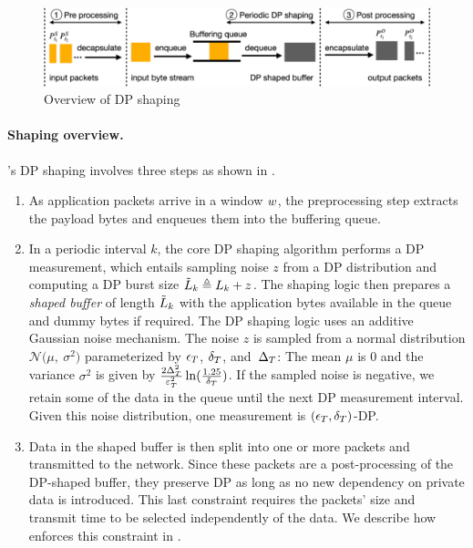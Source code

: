 \begin{figure}[t]
    \centering
    \includegraphics[width=\columnwidth]{figures/dp-overview.pdf}
    \caption{Overview of DP shaping}
    \label{fig:dp-overview}
\end{figure}

\paragraph{Shaping overview.}
\sys's DP shaping involves three steps as shown in .
\begin{enumerate}
    \item As application packets arrive in a window $w$, the preprocessing step extracts the payload bytes and enqueues them into the buffering queue.
    \item In a periodic interval $k$, the core DP shaping algorithm performs a DP measurement, which entails sampling noise $z$ from a DP distribution and computing a DP burst size $\tilde{L}_{k} \triangleq L_{k} + z$.
    The shaping logic then prepares a {\em shaped buffer} of length $\tilde{L}_{k}$ with the application bytes available in the queue and dummy bytes if required.
    The DP shaping logic uses an additive Gaussian noise mechanism.
    The noise $z$ is sampled from a normal distribution $\mathcal{N}\big(\mu,~\sigma^2\big)$ parameterized by $\epsilon_T$, $\delta_T$, and~$\Delta_T$:
    The mean $\mu$ is 0 and the variance $\sigma^2$ is given by $\frac{2\Delta_T^2}{\varepsilon_T^2}\ln(\frac{1.25}{\delta_T})$.
    If the sampled noise is negative, we retain some of the data in the queue until the next DP measurement interval.
    Given this noise distribution, one measurement is \mbox{$(\epsilon_T, \delta_T)$-DP}.
    \item Data in the shaped buffer is then split into one or more packets and transmitted to the network. Since these packets are a post-processing of the DP-shaped buffer, they preserve DP as long as no new dependency on private data is introduced. 
    This last constraint requires the packets' size and transmit time to be selected independently of the data.
    We describe how {\sys} enforces this constraint in .
\end{enumerate}
